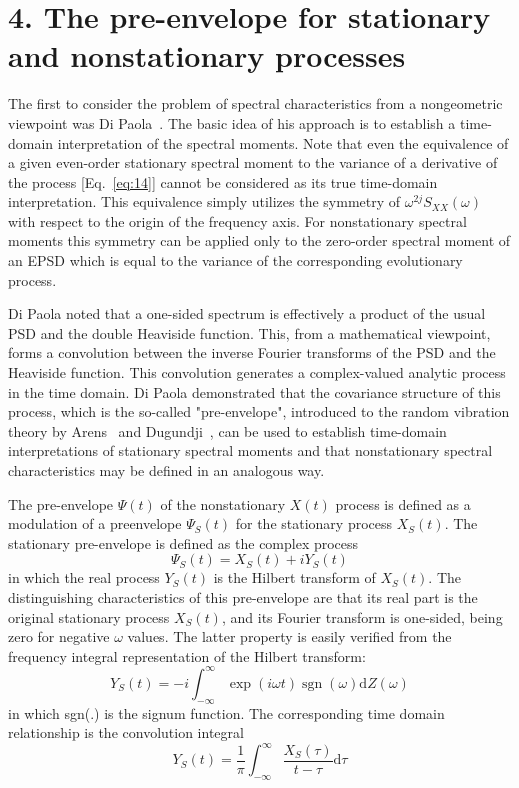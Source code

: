 \documentclass[12pt]{article}
\begin{document}
\section*{4. The pre-envelope for stationary and nonstationary processes}

The first to consider the problem of spectral characteristics from a nongeometric viewpoint was Di Paola~\cite{DiPaola1985}. The basic idea of his approach is to establish a time-domain interpretation of the spectral moments. Note that even the equivalence of a given even-order stationary spectral moment to the variance of a derivative of the process [Eq.~\eqref{eq:14}] cannot be considered as its true time-domain interpretation. This equivalence simply utilizes the symmetry of $\omega^{2 j} S_{X X}(\omega)$ with respect to the origin of the frequency axis. For nonstationary spectral moments this symmetry can be applied only to the zero-order spectral moment of an EPSD which is equal to the variance of the corresponding evolutionary process.

Di Paola noted that a one-sided spectrum is effectively a product of the usual PSD and the double Heaviside function. This, from a mathematical viewpoint, forms a convolution between the inverse Fourier transforms of the PSD and the Heaviside function. This convolution generates a complex-valued analytic process in the time domain. Di Paola demonstrated that the covariance structure of this process, which is the so-called "pre-envelope", introduced to the random vibration theory by Arens~\cite{Arens1957} and Dugundji~\cite{Dugundji1958}, can be used to establish time-domain interpretations of stationary spectral moments and that nonstationary spectral characteristics may be defined in an analogous way.

The pre-envelope $\Psi(t)$ of the nonstationary $X(t)$ process is defined as a modulation of a preenvelope $\Psi_{S}(t)$ for the stationary process $X_{S}(t)$. The stationary pre-envelope is defined as the complex process
\begin{equation}
\Psi_{S}(t)=X_{S}(t)+i Y_{S}(t)
\label{eq:23}
\end{equation}
in which the real process $Y_{S}(t)$ is the Hilbert transform of $X_{S}(t)$. The distinguishing characteristics of this pre-envelope are that its real part is the original stationary process $X_{S}(t)$, and its Fourier transform is one-sided, being zero for negative $\omega$ values. The latter property is easily verified from the frequency integral representation of the Hilbert transform:
\begin{equation}
Y_{S}(t)=-i \int_{-\infty}^{\infty} \exp (i \omega t) \operatorname{sgn}(\omega) \mathrm{d} Z(\omega)
\label{eq:24}
\end{equation}
in which sgn(.) is the signum function. The corresponding time domain relationship is the convolution integral
\begin{equation}
Y_{S}(t)=\frac{1}{\pi} \int_{-\infty}^{\infty} \frac{X_{S}(\tau)}{t-\tau} \mathrm{d} \tau
\label{eq:25}
\end{equation}
\end{document}
